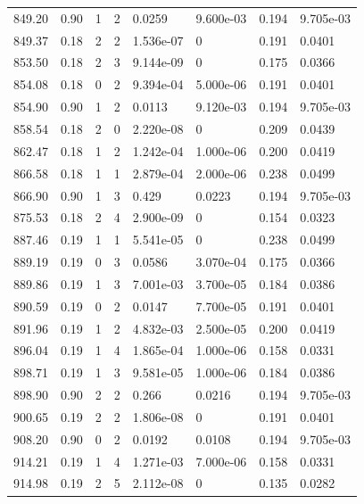\documentclass[preview]{standalone}
\begin{document}
{{{{{\begin{tabular}{L{1.2cm}C{1.2cm} C{0.3cm}C{0.5cm} C{1.4cm}C{1.4cm} C{1.4cm}C{1.4cm}}
  849.20  &  0.90  & 1     &  2 &  0.0259  & 9.600e-03  & 0.194 &  9.705e-03   \\ 
  849.37  &  0.18  & 2     &  2 &  1.536e-07  & 0  & 0.191 &  0.0401   \\ 
  853.50  &  0.18  & 2     &  3 &  9.144e-09  & 0  & 0.175 &  0.0366   \\ 
  854.08  &  0.18  & 0     &  2 &  9.394e-04  & 5.000e-06  & 0.191 &  0.0401   \\ 
  854.90  &  0.90  & 1     &  2 &  0.0113  & 9.120e-03  & 0.194 &  9.705e-03   \\ 
  858.54  &  0.18  & 2     &  0 &  2.220e-08  & 0  & 0.209 &  0.0439   \\ 
  862.47  &  0.18  & 1     &  2 &  1.242e-04  & 1.000e-06  & 0.200 &  0.0419   \\ 
  866.58  &  0.18  & 1     &  1 &  2.879e-04  & 2.000e-06  & 0.238 &  0.0499   \\ 
  866.90  &  0.90  & 1     &  3 &  0.429  & 0.0223  & 0.194 &  9.705e-03   \\ 
  875.53  &  0.18  & 2     &  4 &  2.900e-09  & 0  & 0.154 &  0.0323   \\ 
  887.46  &  0.19  & 1     &  1 &  5.541e-05  & 0  & 0.238 &  0.0499   \\ 
  889.19  &  0.19  & 0     &  3 &  0.0586  & 3.070e-04  & 0.175 &  0.0366   \\ 
  889.86  &  0.19  & 1     &  3 &  7.001e-03  & 3.700e-05  & 0.184 &  0.0386   \\ 
  890.59  &  0.19  & 0     &  2 &  0.0147  & 7.700e-05  & 0.191 &  0.0401   \\ 
  891.96  &  0.19  & 1     &  2 &  4.832e-03  & 2.500e-05  & 0.200 &  0.0419   \\ 
  896.04  &  0.19  & 1     &  4 &  1.865e-04  & 1.000e-06  & 0.158 &  0.0331   \\ 
  898.71  &  0.19  & 1     &  3 &  9.581e-05  & 1.000e-06  & 0.184 &  0.0386   \\ 
  898.90  &  0.90  & 2     &  2 &  0.266  & 0.0216  & 0.194 &  9.705e-03   \\ 
  900.65  &  0.19  & 2     &  2 &  1.806e-08  & 0  & 0.191 &  0.0401   \\ 
  908.20  &  0.90  & 0     &  2 &  0.0192  & 0.0108  & 0.194 &  9.705e-03   \\ 
  914.21  &  0.19  & 1     &  4 &  1.271e-03  & 7.000e-06  & 0.158 &  0.0331   \\ 
  914.98  &  0.19  & 2     &  5 &  2.112e-08  & 0  & 0.135 &  0.0282   \\ 

\end{tabular}}}}}}
\end{document}
